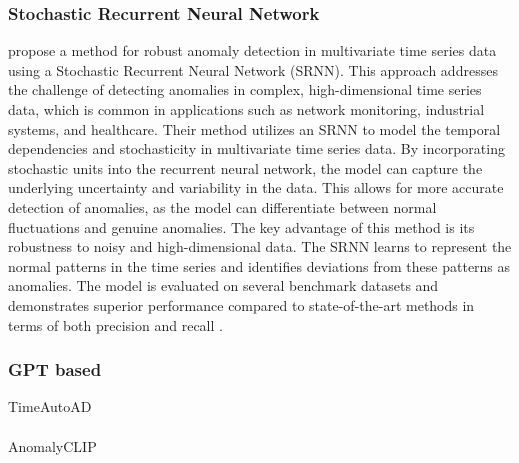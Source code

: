 \subsubsection{Stochastic Recurrent Neural Network}
 propose a method for robust anomaly detection in multivariate time series data using a Stochastic Recurrent Neural Network (SRNN). This approach addresses the challenge of detecting anomalies in complex, high-dimensional time series data, which is common in applications such as network monitoring, industrial systems, and healthcare.
Their method utilizes an SRNN to model the temporal dependencies and stochasticity in multivariate time series data. By incorporating stochastic units into the recurrent neural network, the model can capture the underlying uncertainty and variability in the data. This allows for more accurate detection of anomalies, as the model can differentiate between normal fluctuations and genuine anomalies.
The key advantage of this method is its robustness to noisy and high-dimensional data. The SRNN learns to represent the normal patterns in the time series and identifies deviations from these patterns as anomalies. The model is evaluated on several benchmark datasets and demonstrates superior performance compared to state-of-the-art methods in terms of both precision and recall \cite{su_robust_2019}.
\subsubsection{GPT based}
\cite{jiao_timeautoad_2022} TimeAutoAD\\\\ %
\cite{zhou_anomalyclip_2024} AnomalyCLIP\\\\ %
\cite{li_anomaly_2024} \\\\ %
